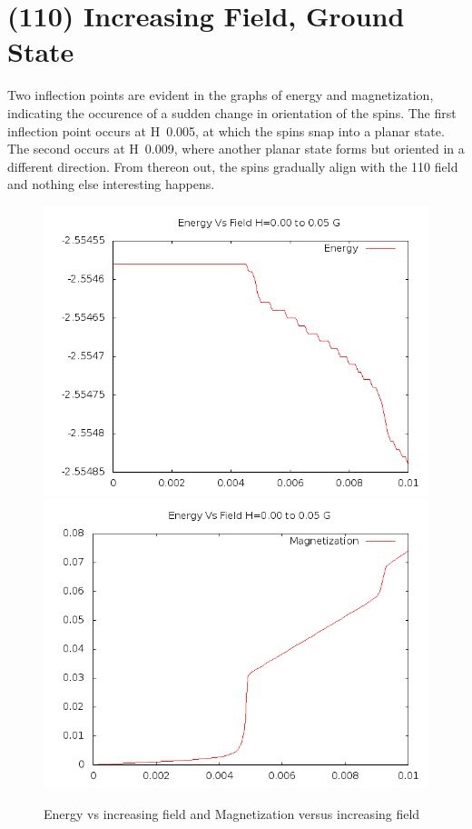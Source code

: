 \documentclass{article}
\begin{document}
\section{(110) Increasing Field, Ground State}
Two inflection points are evident in the graphs of energy and magnetization, indicating the occurence of a sudden
change in orientation of the spins. The first inflection point occurs at H~0.005, at which the spins snap into a 
planar state. The second occurs at H~0.009, where another planar state forms but oriented in a different direction. From 
thereon out, the spins gradually align with the 110 field and nothing else interesting happens. 
\begin{figure}[ht]
 \centering 
\includegraphics[scale=0.3]{110/E000to005G.png}
\includegraphics[scale=0.3]{110/M000to005G.png}
\caption{Energy vs increasing field and Magnetization versus increasing field}
\end{figure}
\end{document}
